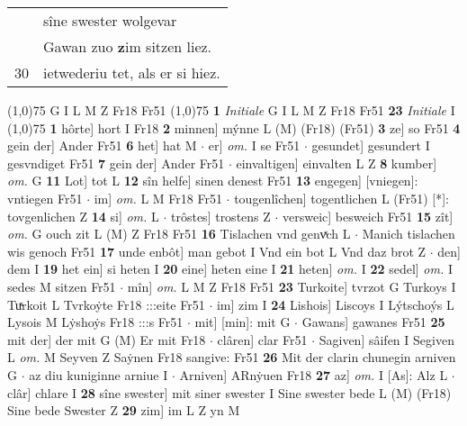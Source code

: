 \documentclass[8pt,a4paper,notitlepage]{article}
\begin{document}
\begin{table}[ht]
\begin{minipage}[t]{0.5\linewidth}
\begin{tabular}{rl}
 & sîne swester wolgevar\\ 
 & Gawan zuo \textbf{z}im sitzen liez.\\ 
30 & ietwederiu tet, als er si hiez.\\ 
\end{tabular}
\scriptsize
\line(1,0){75} \newline
G I L M Z Fr18 Fr51 \newline
\line(1,0){75} \newline
\textbf{1} \textit{Initiale} G I L M Z Fr18 Fr51  \textbf{23} \textit{Initiale} I  \newline
\line(1,0){75} \newline
\textbf{1} hôrte] hort I Fr18 \textbf{2} minnen] mýnne L (M) (Fr18) (Fr51) \textbf{3} ze] so Fr51 \textbf{4} gein der] Ander Fr51 \textbf{6} het] hat M  $\cdot$ er] \textit{om.} I se Fr51  $\cdot$ gesundet] gesundert I gesvndiget Fr51 \textbf{7} gein der] Ander Fr51  $\cdot$ einvaltigen] einvalten L Z \textbf{8} kumber] \textit{om.} G \textbf{11} Lot] tot L \textbf{12} sîn helfe] sinen denest Fr51 \textbf{13} engegen] [vniegen]: vntiegen Fr51  $\cdot$ im] \textit{om.} L M Fr18 Fr51  $\cdot$ tougenlîchen] togentlichen L (Fr51) [*]: tovgenlichen  Z \textbf{14} si] \textit{om.} L  $\cdot$ trôstes] trostens Z  $\cdot$ versweic] besweich Fr51 \textbf{15} zît] \textit{om.} G ouch zit L (M) Z Fr18 Fr51 \textbf{16} Tislachen vnd genvͯch L  $\cdot$ Manich tislachen wis genoch Fr51 \textbf{17} unde enbôt] man gebot I Vnd ein bot L Vnd daz brot Z  $\cdot$ den] dem I \textbf{19} het ein] si heten I \textbf{20} eine] heten eine I \textbf{21} heten] \textit{om.} I \textbf{22} sedel] \textit{om.} I sedes M sitzen Fr51  $\cdot$ mîn] \textit{om.} L M Z Fr18 Fr51 \textbf{23} Turkoite] tvrzot G Turkoys I Tuͯrkoit L Tvrkoẏte Fr18 :::eite Fr51  $\cdot$ im] zim I \textbf{24} Lishois] Liscoys I Lýtschoýs L Lysois M Lẏshoẏs Fr18 :::s Fr51  $\cdot$ mit] [min]: mit G  $\cdot$ Gawans] gawanes Fr51 \textbf{25} mit der] der mit G (M) Er mit Fr18  $\cdot$ clâren] clar Fr51  $\cdot$ Sagiven] sâifen I Segiven L \textit{om.} M Seyven Z Saẏnen Fr18 sangive: Fr51 \textbf{26} Mit der clarin chunegin arniven G  $\cdot$ az diu kuniginne arniue I  $\cdot$ Arniven] ARnẏuen Fr18 \textbf{27} az] \textit{om.} I [As]: Alz L  $\cdot$ clâr] chlare I \textbf{28} sîne swester] mit siner swester I Sine swester bede L (M) (Fr18) Sine bede Swester Z \textbf{29} zim] im L Z yn M \newline
\end{minipage}
\hspace{0.5cm}

\end{table}
\end{document}
